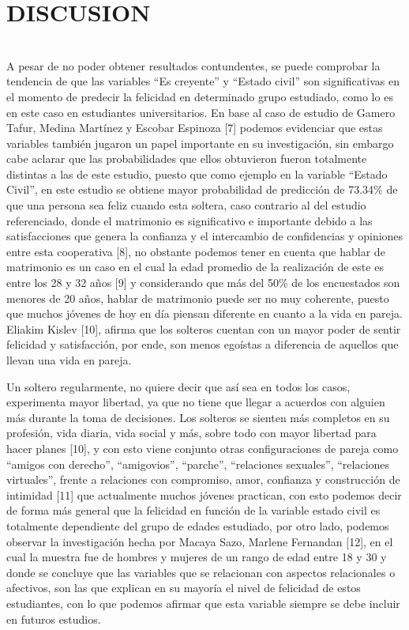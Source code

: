 \documentclass[conference]{IEEEtran}
\begin{document}
\section{DISCUSION}\\

A pesar de no poder obtener resultados contundentes, se puede comprobar la tendencia de que las variables “Es creyente” y “Estado civil” son significativas en el momento de predecir la felicidad en determinado grupo estudiado, como lo es en este caso en estudiantes universitarios. En base al caso de estudio de  Gamero Tafur, Medina Martínez y Escobar Espinoza [7] podemos evidenciar que estas variables también jugaron un papel importante en su investigación, sin embargo cabe aclarar que las probabilidades que ellos obtuvieron fueron totalmente distintas a las de este estudio, puesto que como ejemplo en la variable “Estado Civil”, en este estudio se obtiene mayor probabilidad de predicción de 73.34\% de que una persona sea feliz cuando esta soltera, caso contrario al del estudio referenciado, donde el matrimonio es significativo e importante debido a las satisfacciones que genera la confianza y el intercambio de confidencias y opiniones entre esta cooperativa [8], no obstante podemos tener en cuenta que hablar de matrimonio es un caso en el cual la edad promedio de la realización de este es entre los 28 y 32 años [9] y considerando que más del 50\% de los encuestados son menores de 20 años, hablar de matrimonio puede ser no muy coherente, puesto que muchos jóvenes de hoy en día piensan diferente en cuanto a la vida en pareja. Eliakim Kislev [10], afirma que los solteros cuentan con un mayor poder de sentir felicidad y satisfacción, por ende, son menos egoístas a diferencia de aquellos que llevan una vida en pareja.

   Un soltero regularmente, no quiere decir que así sea en todos los casos, experimenta mayor libertad, ya que no tiene que llegar a acuerdos con alguien más durante la toma de decisiones. Los solteros se sienten más completos en su profesión, vida diaria, vida social y más, sobre todo con mayor libertad para hacer planes [10], y con esto viene conjunto otras configuraciones de pareja  como “amigos con derecho”, “amigovios”, “parche”, “relaciones sexuales”, “relaciones virtuales”, frente a relaciones con compromiso, amor, confianza y construcción de intimidad [11] que actualmente muchos jóvenes practican, con esto podemos decir de forma más general que la felicidad en función de la variable estado civil es totalmente dependiente del grupo de edades estudiado, por otro lado, podemos observar la investigación hecha por Macaya Sazo, Marlene Fernandan [12], en el cual la muestra fue de hombres y mujeres de un rango de edad entre 18 y 30 y donde se concluye que las variables que se relacionan con aspectos relacionales o afectivos, son las que explican en su mayoría el nivel de felicidad de estos estudiantes, con lo que podemos afirmar que esta variable siempre se debe incluir en futuros estudios.
\end{document}
